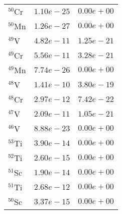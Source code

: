 \begin{tabular}{lll}
 $^{50}$Cr & $1.10e-25 $                                                        & $0.00e+00 $                                                           \\
 $^{50}$Mn & $1.26e-27 $                                                        & $0.00e+00 $                                                           \\
 $^{49}$V  & $4.82e-11 $                                                        & $1.25e-21 $                                                           \\
 $^{49}$Cr & $5.56e-11 $                                                        & $3.28e-21 $                                                           \\
 $^{49}$Mn & $7.74e-26 $                                                        & $0.00e+00 $                                                           \\
 $^{48}$V  & $1.41e-10 $                                                        & $3.80e-19 $                                                           \\
 $^{48}$Cr & $2.97e-12 $                                                        & $7.42e-22 $                                                           \\
 $^{47}$V  & $2.09e-11 $                                                        & $1.05e-21 $                                                           \\
 $^{46}$V  & $8.88e-23 $                                                        & $0.00e+00 $                                                           \\
 $^{53}$Ti & $3.90e-14 $                                                        & $0.00e+00 $                                                           \\
 $^{52}$Ti & $2.60e-15 $                                                        & $0.00e+00 $                                                           \\
 $^{51}$Sc & $1.90e-14 $                                                        & $0.00e+00 $                                                           \\
 $^{51}$Ti & $2.68e-12 $                                                        & $0.00e+00 $                                                           \\
 $^{50}$Sc & $3.37e-15 $                                                        & $0.00e+00 $                                                           \\

\end{tabular}
